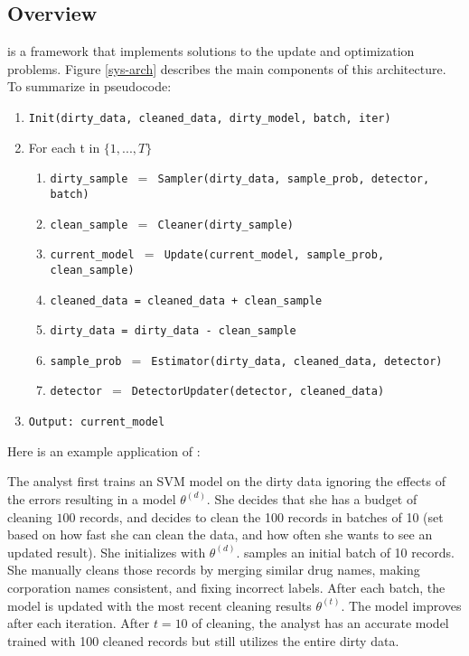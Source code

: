 \subsection{Overview}
\sys is a framework that implements solutions to the update and optimization problems.
Figure \ref{sys-arch} describes the main components of this architecture.
To summarize in pseudocode:
\begin{enumerate}[leftmargin=1em]\scriptsize\sloppy
\item \texttt{Init(dirty\_data, cleaned\_data, dirty\_model, batch, iter)}
\item For each t in $\{1,...,T\}$
\begin{enumerate}
	\item \texttt{dirty\_sample $=$ Sampler(dirty\_data, sample\_prob, detector, batch)}
	\item \texttt{clean\_sample $=$ Cleaner(dirty\_sample)}
	\item \texttt{current\_model $=$ Update(current\_model, sample\_prob, clean\_sample)}
	\item \texttt{cleaned\_data = cleaned\_data + clean\_sample}
	\item \texttt{dirty\_data = dirty\_data - clean\_sample}
	\item \texttt{sample\_prob $=$ Estimator(dirty\_data, cleaned\_data, detector)}
	\item \texttt{detector $=$ DetectorUpdater(detector, cleaned\_data)}
\end{enumerate}
\item \texttt{Output: current\_model}
\end{enumerate}

Here is an example application of \sys:
\begin{example}\label{archex}
The analyst first trains an SVM model on the dirty data ignoring the effects of the errors resulting in a model $\theta^{(d)}$.
She decides that she has a budget of cleaning $100$ records, and decides to clean the 100 records in batches of 10 (set based on how fast she can clean the data, and how often she wants to see an updated result).
She initializes \sys with $\theta^{(d)}$.
\sys samples an initial batch of 10 records.
She manually cleans those records by merging similar drug names, making corporation names consistent, and fixing incorrect labels.
After each batch, the model is updated with the most recent cleaning results $\theta^{(t)}$.
The model improves after each iteration.
After $t=10$ of cleaning, the analyst has an accurate model trained with 100 cleaned records but still utilizes the entire dirty data.
\end{example}

